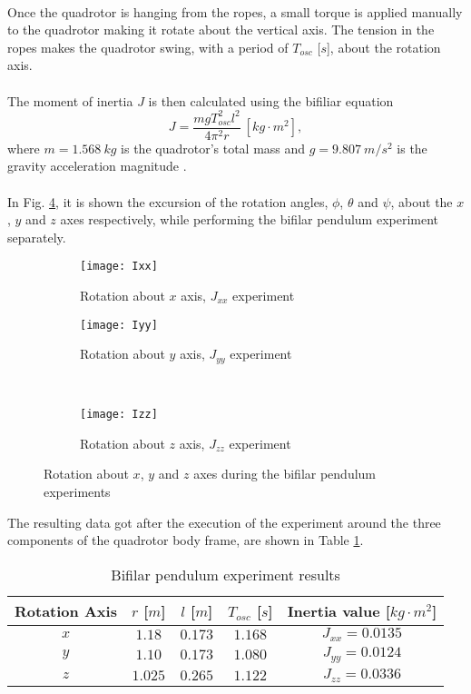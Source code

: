 \\Once the quadrotor is hanging from the ropes, a small torque is applied manually to the quadrotor making it rotate about the vertical axis. The tension in the ropes makes the quadrotor swing, with a period of $T_{osc}$ [$s$], about the rotation axis.
\\\\
The moment of inertia $J$ is then calculated using the bifiliar equation
\begin{equation}
J = \dfrac{mgT_{osc}^{2}l^{2}}{4\pi^{2}r}\ [kg\cdot m^{2}],
\end{equation}
where $m = 1.568\ kg$ is the quadrotor's total mass and $g = 9.807\ m/s^{2}$ is the gravity acceleration magnitude \cite{Mustapa2016}.
\\\\
In Fig. \ref{fig:inertiatest}, it is shown the excursion of the rotation angles, $\phi$, $\theta$ and $\psi$, about the $x$, $y$ and $z$ axes respectively, while performing the bifilar pendulum experiment separately.
\begin{figure}[H]
\begin{subfigure}{.5\linewidth}
\centering
\texttt{[image: Ixx]}
\caption{Rotation about $x$ axis, $J_{xx}$ experiment}
\label{fig:Jxx}
\end{subfigure}%
\begin{subfigure}{.5\linewidth}
\centering
\texttt{[image: Iyy]}
\caption{Rotation about $y$ axis, $J_{yy}$ experiment}
\label{fig:Jyy}
\end{subfigure}\\[1ex]
\begin{subfigure}{\linewidth}
\centering
\texttt{[image: Izz]}
\caption{Rotation about $z$ axis, $J_{zz}$ experiment}
\label{fig:Jzz}
\end{subfigure}
\caption{Rotation about $x$, $y$ and $z$ axes during the bifilar pendulum experiments}
\label{fig:inertiatest}
\end{figure}
The resulting data got after the execution of the experiment around the three components of the quadrotor body frame, are shown in Table \ref{tb:inertiaexperiment}.
\begin{table}[H]
\small
\begin{center}
\caption{Bifilar pendulum experiment results}\label{tb:inertiaexperiment}
\begin{tabular}{c|c|c|c|c}\hline
\rule{0pt}{3ex} Rotation Axis & $r$ [$m$] & $l$ [$m$] & $T_{osc}$ [$s$] & Inertia value [$kg\cdot m^{2}$] \\\hline\hline
\rule{0pt}{3ex} $x$ &  $1.18$ & $0.173$ & $1.168$ & $J_{xx} = 0.0135$ \\[0.7ex]
$y$ &  $1.10$ & $0.173$ & $1.080$ & $J_{yy} = 0.0124$ \\[0.7ex]
$z$ &  $1.025$ & $0.265$ & $1.122$ & $J_{zz} = 0.0336$ \\[0.7ex]\hline
\end{tabular}
\end{center}
\end{table}

